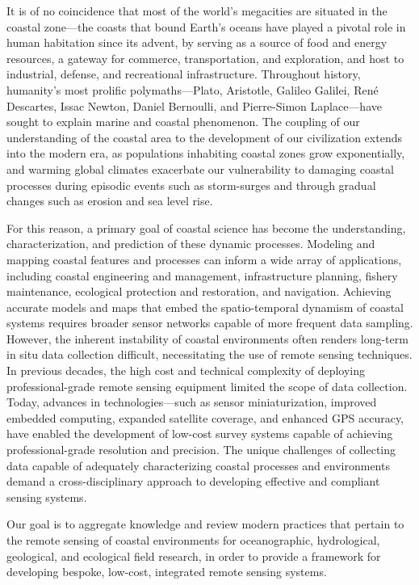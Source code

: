 \documentclass{article}
\begin{document}
\par{It is of no coincidence that most of the world's megacities are situated in the coastal zone---the coasts that bound Earth’s oceans have played a pivotal role in human habitation since its advent, by serving as a source of food and energy resources, a gateway for commerce, transportation, and exploration, and host to industrial, defense, and recreational infrastructure. Throughout history, humanity's most prolific polymaths---Plato, Aristotle, Galileo Galilei, René Descartes, Issac Newton, Daniel Bernoulli, and Pierre-Simon Laplace---have sought to explain marine and coastal phenomenon. The coupling of our understanding of the coastal area to the development of our civilization extends into the modern era, as populations inhabiting coastal zones grow exponentially, and warming global climates exacerbate our vulnerability to damaging coastal processes during episodic events such as storm-surges and through gradual changes such as erosion and sea level rise.}

\par{For this reason, a primary goal of coastal science has become the understanding, characterization, and prediction of these dynamic processes. Modeling and mapping coastal features and processes can inform a wide array of applications, including coastal engineering and management, infrastructure planning, fishery maintenance, ecological protection and restoration, and navigation. Achieving accurate models and maps that embed the spatio-temporal dynamism of coastal systems requires broader sensor networks capable of more frequent data sampling. However, the inherent instability of coastal environments often renders long-term in situ data collection difficult, necessitating the use of remote sensing techniques. In previous decades, the high cost and technical complexity of deploying professional-grade remote sensing equipment limited the scope of data collection. Today, advances in technologies—such as sensor miniaturization, improved embedded computing, expanded satellite coverage, and enhanced GPS accuracy, have enabled the development of low-cost survey systems capable of achieving professional-grade resolution and precision. The unique challenges of collecting data capable of adequately characterizing coastal processes and environments demand a cross-disciplinary approach to developing effective and compliant sensing systems.}

\par{Our goal is to aggregate knowledge and review modern practices that pertain to the remote sensing of coastal environments for oceanographic, hydrological, geological, and ecological field research, in order to provide a framework for developing bespoke, low-cost, integrated remote sensing systems.}
\end{document}
